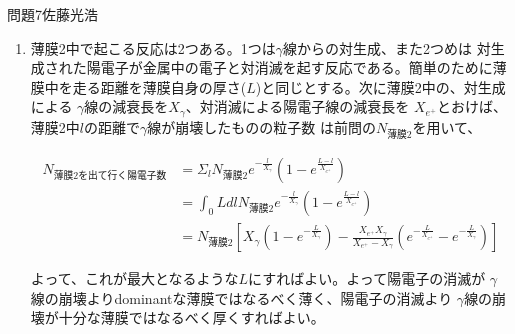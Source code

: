\documentclass[fleqn]{jbook}
\begin{document}
\begin{answer}{問題7}{佐藤光浩}
\begin{enumerate}
\begin{eqnarray}
 \frac{N_{\gamma}}{x} = -\frac{N_{\gamma}}{X_{air}}
\end{eqnarray}
をといて、$N_{\text{薄膜2}} =
N_0(1-e^{-\frac{d \sqrt{1+\frac{1}{\beta^2\gamma^2}}}{X_{air}}})$であるので、
その後の$\gamma \rightarrow e^{+}e^{-}$の対生成過程で電子が飛んで検出器
の方向に出てゆくものの粒子分布は同一とみなせるので陽電子の検出器における
計測率は$1-e^{-\frac{d \sqrt{1+\frac{1}{\beta^2\gamma^2}}}{X_{air}}}$倍になる。

    \item
 薄膜2中で起こる反応は2つある。1つは$\gamma$線からの対生成、また2つめは
対生成された陽電子が金属中の電子と対消滅を起す反応である。簡単のために薄
膜中を走る距離を薄膜自身の厚さ($L$)と同じとする。次に薄膜2中の、対生成による
$\gamma$線の減衰長を$X_{\gamma}$、対消滅による陽電子線の減衰長を
$X_{e^{+}}$とおけば、薄膜2中$l$の距離で$\gamma$線が崩壊したものの粒子数
は前問の$N_{\text{薄膜2}}$を用いて、

\begin{eqnarray}
 N_{\text{薄膜2を出て行く陽電子数}} &= \Sigma_{l} N_{\text{薄膜2}}
 e^{-\frac{l}{X_{\gamma}}} \left( 1- e^{\frac{L-l}{X_{e^{+}}}}\right) \\\
 &= \int_{0}{L} dl N_{\text{薄膜2}}
 e^{-\frac{l}{X_{\gamma}}} \left( 1- e^{\frac{L-l}{X_{e^{+}}}}\right)  \\\
 &=  N_{\text{薄膜2}}
 \left[X_{\gamma}\left(1-e^{-\frac{L}{X_{\gamma}}}\right)
- \frac{X_{e^{+}}X_{\gamma}}{X_{e^{+}}-X_{\gamma}}
 \left(e^{-\frac{L}{X_{e^{+}}}} -
 e^{-\frac{L}{X_{\gamma}}}\right)\right] 
\end{eqnarray}

よって、これが最大となるような$L$にすればよい。よって陽電子の消滅が
$\gamma$線の崩壊よりdominantな薄膜ではなるべく薄く、陽電子の消滅より
$\gamma$線の崩壊が十分な薄膜ではなるべく厚くすればよい。

\end{enumerate}
\end{answer}
\end{document}
